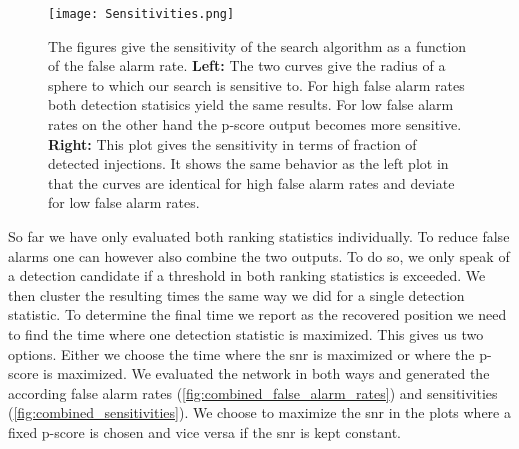 \begin{figure}
\centering
\texttt{[image: Sensitivities.png]}
\caption[Sensitivities of single outputs]{The figures give the sensitivity of the search algorithm as a function of the false alarm rate. \textbf{Left:} The two curves give the radius of a sphere to which our search is sensitive to. For high false alarm rates both detection statisics yield the same results. For low false alarm rates on the other hand the p-score output becomes more sensitive. \textbf{Right:} This plot gives the sensitivity in terms of fraction of detected injections. It shows the same behavior as the left plot in that the curves are identical for high false alarm rates and deviate for low false alarm rates.}\label{fig:sensitivities}
\end{figure}
So far we have only evaluated both ranking statistics individually. To reduce false alarms one can however also combine the two outputs. To do so, we only speak of a detection candidate if a threshold in both ranking statistics is exceeded. We then cluster the resulting times the same way we did for a single detection statistic. To determine the final time we report as the recovered position we need to find the time where one detection statistic is maximized. This gives us two options. Either we choose the time where the \gls{snr} is maximized or where the p-score is maximized. We evaluated the network in both ways and generated the according false alarm rates (\autoref{fig:combined_false_alarm_rates}) and sensitivities (\autoref{fig:combined_sensitivities}). We choose to maximize the \gls{snr} in the plots where a fixed p-score is chosen and vice versa if the \gls{snr} is kept constant.\\
